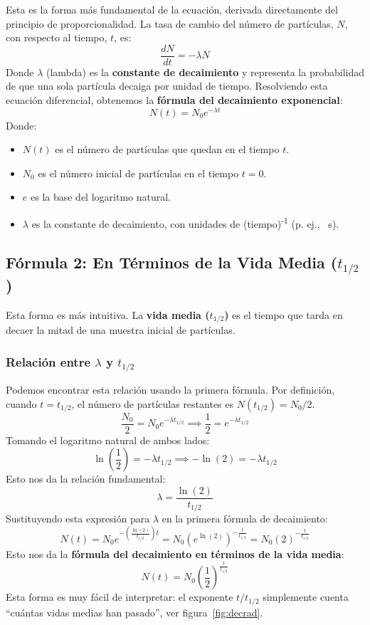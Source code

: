 \documentclass[11pt,a4paper]{article}
\begin{document}
Esta es la forma más fundamental de la ecuación, derivada directamente del principio de proporcionalidad. La tasa de cambio del número de partículas, $N$, con respecto al tiempo, $t$, es:
\[ \frac{dN}{dt} = -\lambda N \]
Donde $\lambda$ (lambda) es la \textbf{constante de decaimiento} y representa la probabilidad de que una sola partícula decaiga por unidad de tiempo. Resolviendo esta ecuación diferencial, obtenemos la \textbf{fórmula del decaimiento exponencial}:
\[ \boxed{N(t) = N_0 e^{-\lambda t}} \]
Donde:
\begin{itemize}
    \item $N(t)$ es el número de partículas que quedan en el tiempo $t$.
    \item $N_0$ es el número inicial de partículas en el tiempo $t=0$.
    \item $e$ es la base del logaritmo natural.
    \item $\lambda$ es la constante de decaimiento, con unidades de (tiempo)\textsuperscript{-1} (p. ej., \si{\per\second}).
\end{itemize}

\subsection*{Fórmula 2: En Términos de la Vida Media ($t_{1/2}$)}

Esta forma es más intuitiva. La \textbf{vida media ($t_{1/2}$)} es el tiempo que tarda en decaer la mitad de una muestra inicial de partículas.

\subsubsection*{Relación entre $\lambda$ y $t_{1/2}$}
Podemos encontrar esta relación usando la primera fórmula. Por definición, cuando $t = t_{1/2}$, el número de partículas restantes es $N(t_{1/2}) = N_0/2$.
\[ \frac{N_0}{2} = N_0 e^{-\lambda t_{1/2}} \implies \frac{1}{2} = e^{-\lambda t_{1/2}} \]
Tomando el logaritmo natural de ambos lados:
\[ \ln\left(\frac{1}{2}\right) = -\lambda t_{1/2} \implies -\ln(2) = -\lambda t_{1/2} \]
Esto nos da la relación fundamental:
\[ \boxed{\lambda = \frac{\ln(2)}{t_{1/2}}} \]
Sustituyendo esta expresión para $\lambda$ en la primera fórmula de decaimiento:
\[ N(t) = N_0 e^{-\left(\frac{\ln(2)}{t_{1/2}}\right)t} = N_0 \left(e^{\ln(2)}\right)^{-\frac{t}{t_{1/2}}} = N_0 (2)^{-\frac{t}{t_{1/2}}} \]
Esto nos da la \textbf{fórmula del decaimiento en términos de la vida media}:
\[ \boxed{N(t) = N_0 \left(\frac{1}{2}\right)^{\frac{t}{t_{1/2}}}} \]
Esta forma es muy fácil de interpretar: el exponente ${t}/{t_{1/2}}$ simplemente cuenta ``cuántas vidas medias han pasado'', ver figura~\ref{fig:decrad}.
\end{document}
